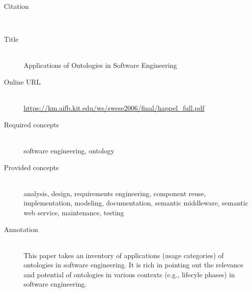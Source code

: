 \begin{description}
\item[Citation]\mbox{}\\
\cite{HappelS06}
\item[Title]\mbox{}\\
Applications of Ontologies in Software Engineering
\item[Online URL]\mbox{}\\
{\footnotesize\url{https://km.aifb.kit.edu/ws/swese2006/final/happel_full.pdf}}
\item[Required concepts]\mbox{}\\
software engineering, ontology\item[Provided concepts]\mbox{}\\
analysis, design, requirements engineering, component reuse, implementation, modeling, documentation, semantic middleware, semantic web service, maintenance, testing\item[Annotation]\mbox{}\\
This paper takes an inventory of applications (usage categories) of ontologies in software engineering. It is rich in pointing out the relevance and potential of ontologies in various contexts (e.g., lifecyle phases) in software engineering.
\end{description}

